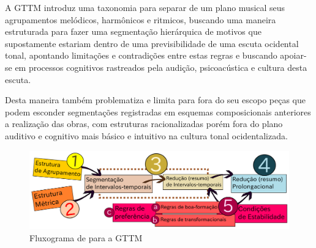 \documentclass[
	12pt,				%
	openright,			%
	twoside,			%
	a4paper,			%
	english,			%
	french,				%
	spanish,			%
	brazil				%
	]{abntex2}
\begin{document}
A GTTM introduz uma taxonomia para separar de um plano musical seus agrupamentos melódicos, harmônicos e ritmicos, buscando uma maneira estruturada para fazer uma segmentação hierárquica de motivos que supostamente estariam dentro de uma previsibilidade de uma escuta ocidental tonal, apontando limitações e contradições entre estas regras e buscando apoiar-se em processos cognitivos rastreados pela audição, psicoacústica e cultura desta escuta. 

Desta maneira também problematiza e limita para fora do seu escopo peças que podem esconder segmentações registradas em esquemas composicionais anteriores a realização das obras, com estruturas racionalizadas porém fora do plano auditivo e cognitivo mais básico e intuitivo na cultura tonal ocidentalizada. 

\pagebreak
\begin{figure}[!h]
	\caption{\label{fig_grafico}Fluxograma de  para a GTTM}
	\begin{center}
	    \includegraphics[scale=0.5]{gttm/GTTM_rules.pdf}
	\end{center}
\end{figure}
\end{document}
